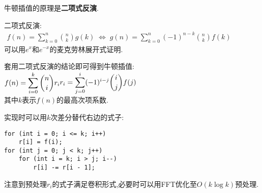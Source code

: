牛顿插值的原理是\textbf{二项式反演}.

二项式反演: \\
\begin{math}
\begin{aligned}
f(n)=\sum_{k=0}^n{n\choose k}g(k)\;\Leftrightarrow\;g(n)=\sum_{k=0}^n\left(-1\right)^{n-k}{n\choose k}f(k)
\end{aligned}
\end{math} \\
可以用$e^x$和$e^{-x}​$的麦克劳林展开式证明.

套用二项式反演的结论即可得到牛顿插值: \\
\begin{math}
\begin{aligned} f(n)=\sum_{i=0}^{k}{n\choose i}r_i \end{aligned} \\ 
\begin{aligned} r_i=\sum_{j=0}^i(-1)^{i-j}{i\choose j}f(j) \end{aligned}
\end{math} \\
其中$k$表示$f(n)$的最高次项系数.

实现时可以用$k$次差分替代右边的式子:

\begin{verbatim}
for (int i = 0; i <= k; i++)
    r[i] = f(i);
for (int j = 0; j < k; j++)
    for (int i = k; i > j; i--)
        r[i] -= r[i - 1];
\end{verbatim}

注意到预处理$r_i​$的式子满足卷积形式,必要时可以用FFT优化至$O(k\log k)​$预处理.